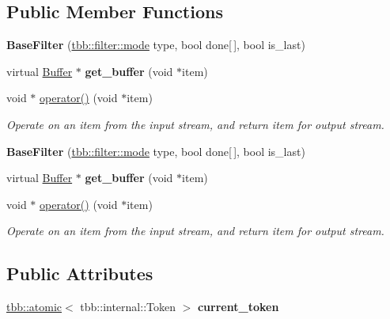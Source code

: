 \subsection*{Public Member Functions}
\begin{DoxyCompactItemize}
\item 
\hypertarget{classBaseFilter_a461641132f32caa77449098e4bf8bb57}{}{\bfseries Base\+Filter} (\hyperlink{classtbb_1_1filter_a8145c736bafcf0b401d50bf1a1df9125}{tbb\+::filter\+::mode} type, bool done\mbox{[}$\,$\mbox{]}, bool is\+\_\+last)\label{classBaseFilter_a461641132f32caa77449098e4bf8bb57}

\item 
\hypertarget{classBaseFilter_ac940b505e18478ca6fd9cf753b16cb50}{}virtual \hyperlink{structBuffer}{Buffer} $\ast$ {\bfseries get\+\_\+buffer} (void $\ast$item)\label{classBaseFilter_ac940b505e18478ca6fd9cf753b16cb50}

\item 
void $\ast$ \hyperlink{classBaseFilter_a603a4b099a76e84d427fcf89e4cf91a0}{operator()} (void $\ast$item)
\begin{DoxyCompactList}\small\item\em Operate on an item from the input stream, and return item for output stream. \end{DoxyCompactList}\item 
\hypertarget{classBaseFilter_a461641132f32caa77449098e4bf8bb57}{}{\bfseries Base\+Filter} (\hyperlink{classtbb_1_1filter_a8145c736bafcf0b401d50bf1a1df9125}{tbb\+::filter\+::mode} type, bool done\mbox{[}$\,$\mbox{]}, bool is\+\_\+last)\label{classBaseFilter_a461641132f32caa77449098e4bf8bb57}

\item 
\hypertarget{classBaseFilter_ac940b505e18478ca6fd9cf753b16cb50}{}virtual \hyperlink{structBuffer}{Buffer} $\ast$ {\bfseries get\+\_\+buffer} (void $\ast$item)\label{classBaseFilter_ac940b505e18478ca6fd9cf753b16cb50}

\item 
void $\ast$ \hyperlink{classBaseFilter_a603a4b099a76e84d427fcf89e4cf91a0}{operator()} (void $\ast$item)
\begin{DoxyCompactList}\small\item\em Operate on an item from the input stream, and return item for output stream. \end{DoxyCompactList}\end{DoxyCompactItemize}
\subsection*{Public Attributes}
\begin{DoxyCompactItemize}
\item 
\hypertarget{classBaseFilter_a735f7eab6b912d7196afc71347c3582f}{}\hyperlink{structtbb_1_1atomic}{tbb\+::atomic}$<$ tbb\+::internal\+::\+Token $>$ {\bfseries current\+\_\+token}\label{classBaseFilter_a735f7eab6b912d7196afc71347c3582f}

\end{DoxyCompactItemize}
